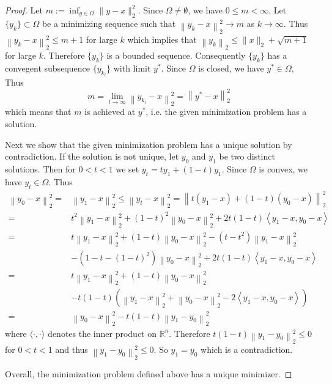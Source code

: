 \begin{proof}
    Let $m:=\inf _{y \in \Omega}\|y-x\|_2^{2}$. Since $\Omega \neq \emptyset$, we have $0 \leq m < \infty$. Let $\{y_k\} \subset \Omega$ be a minimizing sequence such that $\left\|y_{k}-x\right\|_2^{2} \rightarrow m$ as $k \rightarrow \infty$. Thus $\left\|y_{k}-x\right\|_2^{2} \leq m+1$ for large $k$ which implies that $\left\|y_{k}\right\|_2 \leq\|x\|_2+\sqrt{m+1}$ for large $k$. Therefore $\{y_k\}$ is a bounded sequence. Consequently $\{y_k\}$ has a convegent subsequence  $\{y_{k_{l}}\}$ with limit $y^*$. Since $\Omega$ is closed, we have $y^* \in \Omega$, Thus
    $$
    m=\lim _{l \rightarrow \infty}\left\|y_{k_{l}}-x\right\|_2^{2}=\left\|y^{*}-x\right\|_2^{2}
    $$
    which means that $m$ is achieved at $y^*$, i.e. the given minimization problem has a solution. 
    \par Next we show that the given minimization problem has a unique solution by contradiction. If the solution is not unique, let $y_0$ and $y_1$ be two distinct solutions. Then for $0 < t < 1$ we set $y_{t}=t y_{1}+(1-t) y_{1}$. Since $\Omega$ is convex, we have $y_t \in \Omega$. Thus
    $$
    \begin{aligned}
        \left\|y_{0}-x\right\|_2^{2}=&\left\|y_{1}-x\right\|_2^{2} \leq\left\|y_{t}-x\right\|_2^{2}=\left\|t\left(y_{1}-x\right)+(1-t)\left(y_{0}-x\right)\right\|_2^{2} \\
        =& t^{2}\left\|y_{1}-x\right\|_2^{2}+(1-t)^{2}\left\|y_{0}-x\right\|_2^{2}+2 t(1-t)\left\langle y_{1}-x, y_{0}-x\right\rangle \\
        =& t\left\|y_{1}-x\right\|_2^{2}+(1-t)\left\|y_{0}-x\right\|_2^{2}-\left(t-t^{2}\right)\left\|y_{1}-x\right\|_2^{2} \\ 
        &-\left(1-t-(1-t)^{2}\right)\left\|y_{0}-x\right\|_2^{2}+2 t(1-t)\left\langle y_{1}-x, y_{0}-x\right\rangle \\
        =& t\left\|y_{1}-x\right\|_2^{2}+(1-t)\left\|y_{0}-x\right\|_2^{2} \\ 
        &-t(1-t)\left(\left\|y_{1}-x\right\|_2^{2}+\left\|y_{0}-x\right\|_2^{2}-2\left\langle y_{1}-x, y_{0}-x\right\rangle\right) \\
        =&\left\|y_{0}-x\right\|_2^{2}-t(1-t)\left\|y_{1}-y_{0}\right\|_2^{2} 
    \end{aligned}
    $$
    where $\langle\cdot, \cdot\rangle$ denotes the inner product on $\mathbb{R}^n$. Therefore $t(1-t)\left\|y_{1}-y_{0}\right\|_2^{2} \leq 0$ for $0 < t < 1$ and thus $\left\|y_{1}-y_{0}\right\|_2^{2} \leq 0$. So $y_1 = y_0$ 
    which is a contradiction. 
    \par Overall, the minimization problem defined above has a unique minimizer. 
\end{proof}
